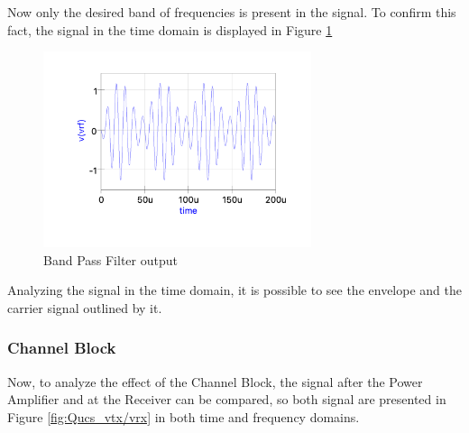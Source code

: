 Now only the desired band of frequencies is present in the signal. To confirm this fact, the signal in the time domain is displayed in Figure \ref{fig:Qucs_vrf}

\begin{figure}[H]
    \centering
    \includegraphics*[width=0.7\textwidth]{Images/Qucs_vrf.png}
    \caption{Band Pass Filter output}
    \label{fig:Qucs_vrf}
\end{figure}

Analyzing the signal in the time domain, it is possible to see the envelope and the carrier signal outlined by it. 

\subsubsection{Channel Block}

Now, to analyze the effect of the Channel Block, the signal after the Power Amplifier and at the Receiver can be compared, so both signal are presented in Figure \ref{fig:Qucs_vtx/vrx} in both time and frequency domains.

